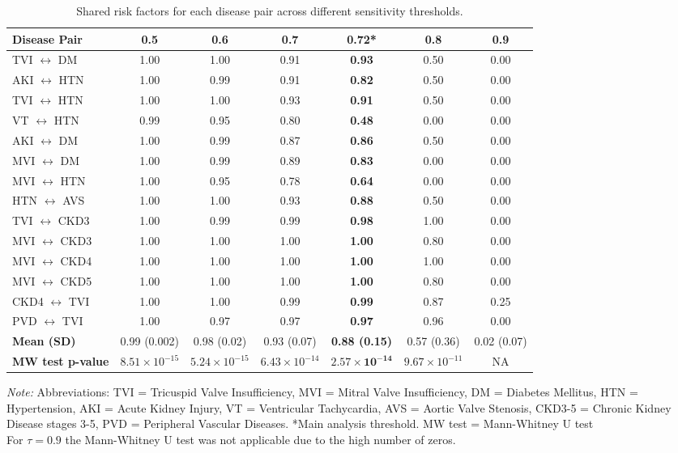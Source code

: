 \begin{table}[ht]
\centering
\caption{Shared risk factors for each disease pair across different sensitivity thresholds.}
\label{ST:shared_rf_sensitivity}
\small
\begin{tabular}{|l|c|c|c|c|c|c|}
\hline
\textbf{Disease Pair} & \textbf{0.5} & \textbf{0.6} & \textbf{0.7} & \textbf{0.72*} & \textbf{0.8} & \textbf{0.9} \\
\hline
TVI $\leftrightarrow$ DM   & 1.00 & 1.00 & 0.91 & \textbf{0.93} & 0.50 & 0.00 \\
AKI $\leftrightarrow$ HTN  & 1.00 & 0.99 & 0.91 & \textbf{0.82} & 0.50 & 0.00 \\
TVI $\leftrightarrow$ HTN  & 1.00 & 1.00 & 0.93 & \textbf{0.91} & 0.50 & 0.00 \\
VT $\leftrightarrow$ HTN   & 0.99 & 0.95 & 0.80 & \textbf{0.48} & 0.00 & 0.00 \\
AKI $\leftrightarrow$ DM   & 1.00 & 0.99 & 0.87 & \textbf{0.86} & 0.50 & 0.00 \\
MVI $\leftrightarrow$ DM   & 1.00 & 0.99 & 0.89 & \textbf{0.83} & 0.00 & 0.00 \\
MVI $\leftrightarrow$ HTN  & 1.00 & 0.95 & 0.78 & \textbf{0.64} & 0.00 & 0.00 \\
HTN $\leftrightarrow$ AVS  & 1.00 & 1.00 & 0.93 & \textbf{0.88} & 0.50 & 0.00 \\
TVI $\leftrightarrow$ CKD3 & 1.00 & 0.99 & 0.99 & \textbf{0.98} & 1.00 & 0.00 \\
MVI $\leftrightarrow$ CKD3 & 1.00 & 1.00 & 1.00 & \textbf{1.00} & 0.80 & 0.00 \\
MVI $\leftrightarrow$ CKD4 & 1.00 & 1.00 & 1.00 & \textbf{1.00} & 1.00 & 0.00 \\
MVI $\leftrightarrow$ CKD5 & 1.00 & 1.00 & 1.00 & \textbf{1.00} & 0.80 & 0.00 \\
CKD4 $\leftrightarrow$ TVI & 1.00 & 1.00 & 0.99 & \textbf{0.99} & 0.87 & 0.25 \\
PVD $\leftrightarrow$ TVI  & 1.00 & 0.97 & 0.97 & \textbf{0.97} & 0.96 & 0.00 \\
\hline
\textbf{Mean (SD)} & 0.99 (0.002) & 0.98 (0.02) & 0.93 (0.07) & \textbf{0.88 (0.15)} & 0.57 (0.36) & 0.02 (0.07) \\
\textbf{MW test p-value} & $8.51 \times 10^{-15}$ & $5.24 \times 10^{-15}$ & $6.43 \times 10^{-14}$ & $\mathbf{2.57 \times 10^{-14}}$ & $9.67 \times 10^{-11}$ & NA \\
\hline
\end{tabular}
\vspace{0.8em}
\footnotesize
\vspace{0.3em}
\footnotesize
\parbox{0.97\linewidth}{
\textit{Note:} Abbreviations: TVI = Tricuspid Valve Insufficiency, MVI = Mitral Valve Insufficiency, DM = Diabetes Mellitus, HTN = Hypertension, AKI = Acute Kidney Injury, VT = Ventricular Tachycardia, AVS = Aortic Valve Stenosis, CKD3-5 = Chronic Kidney Disease stages 3-5, PVD = Peripheral Vascular Diseases. *Main analysis threshold. MW test = Mann-Whitney U test\\
For $\tau = 0.9$ the Mann-Whitney U test was not applicable due to the high number of zeros.
}
\end{table}

